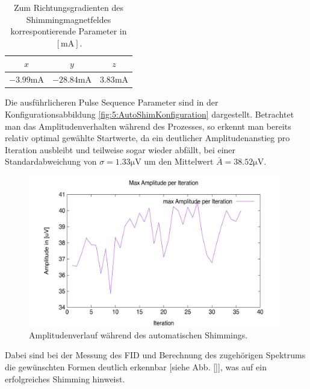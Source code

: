 \documentclass{article}
\begin{document}
            \begin{table}[H]
                \centering
                \begin{tabular}{|c|c|c|}
                    \hline
                    $x$ & $y$ & $z$ \\
                    \hline\hline
                    $-3.99\si{\milli\ampere}$ & $-28.84\si{\milli\ampere}$ & $3.83\si{\milli\ampere}$
                    \\\hline
                \end{tabular}
                \caption{Zum Richtungsgradienten des Shimmingmagnetfeldes korrespontierende Parameter in $[\si{\milli\ampere}]$.}
                \label{tab:5:AutoShimParameter}
            \end{table}
            Die ausführlicheren Pulse Sequence Parameter sind in der Konfigurationsabbildung \ref{fig:5:AutoShimKonfiguration} dargestellt. Betrachtet man das Amplitudenverhalten während des Prozesses, so erkennt man bereits relativ optimal gewählte Startwerte, da ein deutlicher Amplitudenanstieg pro Iteration ausbleibt und teilweise sogar wieder abfällt, bei einer Standardabweichung von $\sigma = 1.33\si{\micro\volt}$ um den Mittelwert $\overline A = 38.52\si{\micro\volt}$. 
            \begin{figure}[H]
                \centering
                \includegraphics[width=11cm]{../Bilddateien/AutoShim2_Iteration.png}
                \caption{Amplitudenverlauf während des automatischen Shimmings.}
                \label{fig:5:AutoShimAmplitudenverlauf}
            \end{figure}
            Dabei sind bei der Messung des FID und Berechnung des zugehörigen Spektrums die gewünschten Formen deutlich erkennbar [siehe Abb. \ref{}], was auf ein erfolgreiches Shimming hinweist.
\end{document}

